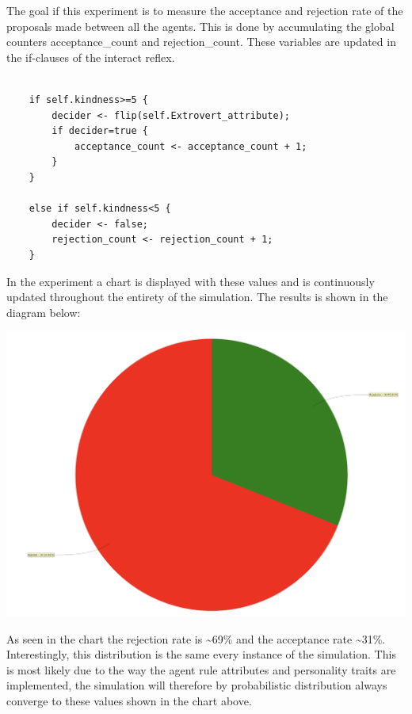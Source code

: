 \documentclass[a4paper,10pt]{article}
\begin{document}
The goal if this experiment is to measure the acceptance and rejection rate of the proposals made between all the agents. This is done by accumulating the global counters acceptance\_count and rejection\_count. These variables are updated in the if-clauses of the interact reflex. 

\begin{verbatim}

    if self.kindness>=5 {
		decider <- flip(self.Extrovert_attribute);
		if decider=true {
			acceptance_count <- acceptance_count + 1;
        }
    }
    
    else if self.kindness<5 {
	    decider <- false;
	    rejection_count <- rejection_count + 1;
    }
\end{verbatim}

In the experiment a chart is displayed with these values and is continuously updated throughout the entirety of the simulation. The results is shown in the diagram below:

\begin{center}{}
\centering\includegraphics[scale=0.05]{original_exp.png}\par
\end{center}

As seen in the chart the rejection rate is \textasciitilde 69\% and the acceptance rate \textasciitilde 31\%. Interestingly, this distribution is the same every instance of the simulation. This is most likely due to the way the agent rule attributes and personality traits are implemented, the simulation will therefore by probabilistic distribution always converge to these values shown in the chart above. 
\end{document}
